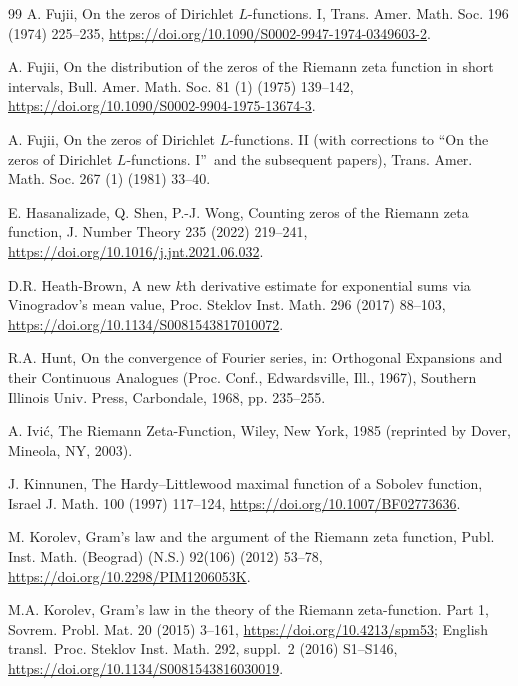 \documentclass[preprint,12pt]{elsarticle}
\numberwithin{equation}{section}
\theoremstyle{plain}
\theoremstyle{definition}
\theoremstyle{remark}
\begin{document}
\begin{thebibliography}{99}
A. Fujii, On the zeros of Dirichlet $L$-functions. I, Trans. Amer. Math. Soc. 196 (1974) 225--235, \href{https://doi.org/10.1090/S0002-9947-1974-0349603-2}{https://doi.org/10.1090/S0002-9947-1974-0349603-2}.

A. Fujii, On the distribution of the zeros of the Riemann zeta function in short intervals, Bull. Amer. Math. Soc. 81 (1) (1975) 139--142, \href{https://doi.org/10.1090/S0002-9904-1975-13674-3}{https://doi.org/10.1090/S0002-9904-1975-13674-3}.

A. Fujii, On the zeros of Dirichlet $L$-functions. II (with corrections to ``On the zeros of Dirichlet $L$-functions. I\textquotedblright\ and the subsequent papers), Trans. Amer. Math. Soc. 267 (1) (1981) 33--40.

E. Hasanalizade, Q. Shen, P.-J. Wong, Counting zeros of the Riemann zeta function, J. Number Theory 235 (2022) 219--241, \href{https://doi.org/10.1016/j.jnt.2021.06.032}{https://doi.org/10.1016/j.jnt.2021.06.032}.

D.R. Heath-Brown, A new $k$th derivative estimate for exponential sums via Vinogradov's mean value, Proc. Steklov Inst. Math. 296 (2017) 88--103, \href{https://doi.org/10.1134/S0081543817010072}{https://doi.org/10.1134/S0081543817010072}.

R.A. Hunt, On the convergence of Fourier series, in: Orthogonal Expansions and their Continuous Analogues (Proc. Conf., Edwardsville, Ill., 1967), Southern Illinois Univ. Press, Carbondale, 1968, pp. 235--255.

A. Ivi\'c, The Riemann Zeta-Function, Wiley, New York, 1985 (reprinted by Dover, Mineola, NY, 2003).

J. Kinnunen, The Hardy--Littlewood maximal function of a Sobolev function, Israel J. Math. 100 (1997) 117--124, \href{https://doi.org/10.1007/BF02773636}{https://doi.org/10.1007/BF02773636}.

M. Korolev, Gram's law and the argument of the Riemann zeta function, Publ. Inst. Math. (Beograd) (N.S.) 92(106) (2012) 53--78, \href{https://doi.org/10.2298/PIM1206053K}{https://doi.org/10.2298/PIM1206053K}.

M.A. Korolev, Gram\textquoteright s law in the theory of the Riemann zeta-function. Part 1, Sovrem. Probl. Mat. 20 (2015) 3--161, \href{https://doi.org/10.4213/spm53}{https://doi.org/10.4213/spm53}; English transl.\ Proc. Steklov Inst. Math. 292, suppl.~2 (2016) S1--S146, \href{https://doi.org/10.1134/S0081543816030019}{https://doi.org/10.1134/S0081543816030019}.


\end{thebibliography}
\end{document}
